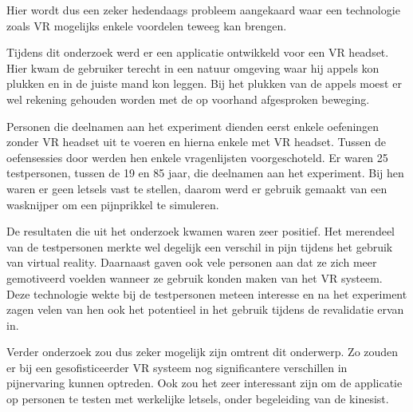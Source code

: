 Hier wordt dus een zeker hedendaags probleem aangekaard waar een technologie zoals VR mogelijks enkele voordelen teweeg kan brengen.

Tijdens dit onderzoek werd er een applicatie ontwikkeld voor een VR headset. Hier kwam de gebruiker terecht in een natuur omgeving waar hij appels kon plukken en in de juiste mand kon leggen. Bij het plukken van de appels moest er wel rekening gehouden worden met de op voorhand afgesproken beweging.

Personen die deelnamen aan het experiment dienden eerst enkele oefeningen zonder VR headset uit te voeren en hierna enkele met VR headset. Tussen de oefensessies door werden hen enkele vragenlijsten voorgeschoteld. Er waren 25 testpersonen, tussen de 19 en 85 jaar, die deelnamen aan het experiment. Bij hen waren er geen letsels vast te stellen, daarom werd er gebruik gemaakt van een wasknijper om een pijnprikkel te simuleren.

De resultaten die uit het onderzoek kwamen waren zeer positief. Het merendeel van de testpersonen merkte wel degelijk een verschil in pijn tijdens het gebruik van virtual reality. Daarnaast gaven ook vele personen aan dat ze zich meer gemotiveerd voelden wanneer ze gebruik konden maken van het VR systeem. Deze technologie wekte bij de testpersonen meteen interesse en na het experiment zagen velen van hen ook het potentieel in het gebruik tijdens de revalidatie ervan in.

Verder onderzoek zou dus zeker mogelijk zijn omtrent dit onderwerp. Zo zouden er bij een gesofisticeerder VR systeem nog significantere verschillen in pijnervaring kunnen optreden. Ook zou het zeer interessant zijn om de applicatie op personen te testen met werkelijke letsels, onder begeleiding van de kinesist.
